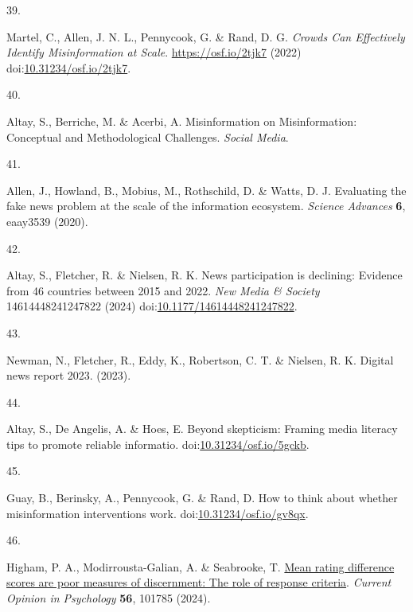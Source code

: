 \documentclass[
  man]{apa6}
\newlength{\cslhangindent}
\newlength{\csllabelwidth}
\newenvironment{CSLReferences}[2] %
 {\begin{list}{}{%
  \setlength{\itemindent}{0pt}
  \setlength{\leftmargin}{0pt}
  \setlength{\parsep}{0pt}
  \ifodd #1
   \setlength{\leftmargin}{\cslhangindent}
   \setlength{\itemindent}{-1\cslhangindent}
  \fi
  \setlength{\itemsep}{#2\baselineskip}}}
 {\end{list}}
\newcommand{\CSLLeftMargin}[1]{\parbox[t]{\csllabelwidth}{\strut#1\strut}}
\newcommand{\CSLRightInline}[1]{\parbox[t]{\linewidth - \csllabelwidth}{\strut#1\strut}}
\begin{document}
\begin{CSLReferences}{0}{0}
\CSLLeftMargin{39. }%
\CSLRightInline{Martel, C., Allen, J. N. L., Pennycook, G. \& Rand, D. G. \emph{Crowds Can Effectively Identify Misinformation at Scale}. \url{https://osf.io/2tjk7} (2022) doi:\href{https://doi.org/10.31234/osf.io/2tjk7}{10.31234/osf.io/2tjk7}.}

\CSLLeftMargin{40. }%
\CSLRightInline{Altay, S., Berriche, M. \& Acerbi, A. Misinformation on Misinformation: Conceptual and Methodological Challenges. \emph{Social Media}.}

\CSLLeftMargin{41. }%
\CSLRightInline{Allen, J., Howland, B., Mobius, M., Rothschild, D. \& Watts, D. J. Evaluating the fake news problem at the scale of the information ecosystem. \emph{Science Advances} \textbf{6}, eaay3539 (2020).}

\CSLLeftMargin{42. }%
\CSLRightInline{Altay, S., Fletcher, R. \& Nielsen, R. K. News participation is declining: Evidence from 46 countries between 2015 and 2022. \emph{New Media \& Society} 14614448241247822 (2024) doi:\href{https://doi.org/10.1177/14614448241247822}{10.1177/14614448241247822}.}

\CSLLeftMargin{43. }%
\CSLRightInline{Newman, N., Fletcher, R., Eddy, K., Robertson, C. T. \& Nielsen, R. K. Digital news report 2023. (2023).}

\CSLLeftMargin{44. }%
\CSLRightInline{Altay, S., De Angelis, A. \& Hoes, E. Beyond skepticism: Framing media literacy tips to promote reliable informatio. doi:\href{https://doi.org/10.31234/osf.io/5gckb}{10.31234/osf.io/5gckb}.}

\CSLLeftMargin{45. }%
\CSLRightInline{Guay, B., Berinsky, A., Pennycook, G. \& Rand, D. How to think about whether misinformation interventions work. doi:\href{https://doi.org/10.31234/osf.io/gv8qx}{10.31234/osf.io/gv8qx}.}

\CSLLeftMargin{46. }%
\CSLRightInline{Higham, P. A., Modirrousta-Galian, A. \& Seabrooke, T. \href{https://doi.org/10.1016/j.copsyc.2023.101785}{Mean rating difference scores are poor measures of discernment: The role of response criteria}. \emph{Current Opinion in Psychology} \textbf{56}, 101785 (2024).}


\end{CSLReferences}
\end{document}
